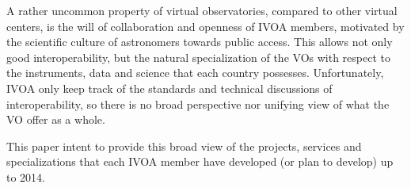A rather uncommon property of virtual observatories, compared to other virtual 
centers, is the will of collaboration and openness of IVOA members, motivated by 
the scientific culture of astronomers towards public access. This allows not only good
interoperability, but the natural specialization of the VOs with respect to
the instruments, data and science that each country possesses. 
Unfortunately, IVOA only keep track of the standards and technical discussions
of interoperability, so there is no broad perspective nor unifying view of what
the VO offer as a whole.

This paper intent to provide this broad view of the projects, services and specializations
that each IVOA member have developed (or plan to develop) up to 2014. 





